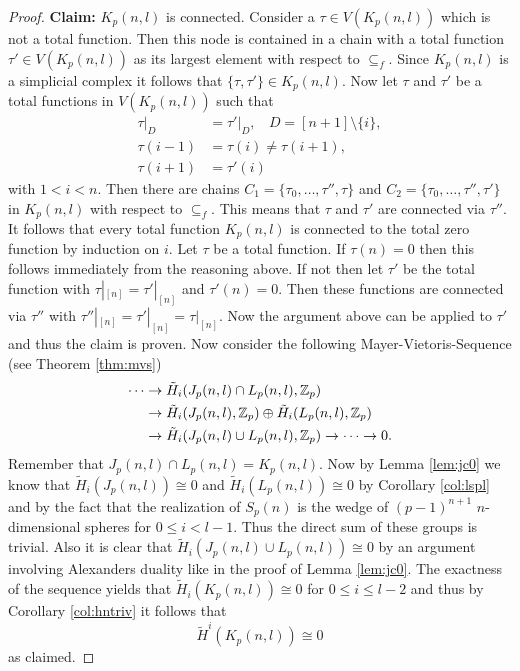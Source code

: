 \begin{proof}
  \textbf{Claim:} $K_p(n,l)$ is connected. Consider a $\tau \in V(K_p(n,l))$ which is not a total function. Then this node is contained in a chain with a total function $\tau' \in V(K_p(n,l))$ as its largest element with respect to $\subseteq_f$. Since $K_p(n,l)$ is a simplicial complex it follows that $\{\tau, \tau'\} \in K_p(n,l)$.
  Now let $\tau$ and $\tau'$ be a total functions in $V(K_p(n,l))$ such that
  \begin{align*}
    \tau|_D &= \tau'|_D, \:\:\:\: D = [n+1]\setminus \{i\}, \\
    \tau(i-1) &= \tau(i) \neq \tau(i+1), \\
    \tau(i+1) &= \tau'(i)
  \end{align*}
  with $1 < i < n$.
  Then there are chains $C_1 = \{\tau_0, \ldots, \tau'', \tau\}$ and $C_2 = \{\tau_0, \ldots, \tau'', \tau' \}$ in $K_p(n,l)$ with respect to $\subseteq_f$. This means that $\tau$ and $\tau'$ are connected via $\tau''$.
  It follows that every total function $K_p(n,l)$ is connected to the total zero function by induction on $i$. Let $\tau$ be a total function. If $\tau(n) = 0$ then this follows immediately from the reasoning above. If not then let $\tau'$ be the total function with $\tau|_{[n]} = \tau'|_{[n]}$ and $\tau'(n) = 0$. Then these functions are connected via $\tau''$ with $\tau''|_{[n]} = \tau'|_{[n]} = \tau|_{[n]}$. Now the argument above can be applied to $\tau'$ and thus the claim is proven.
  Now consider the following Mayer-Vietoris-Sequence (see Theorem \ref{thm:mvs})
  \begin{align*}
    \label{eq:mayvietk}
    \cdots &\to \tilde{H}_i(J_p(n,l)\cap L_p(n,l), \mathbb{Z}_p) \\ &\to \tilde{H}_i(J_p(n,l), \mathbb{Z}_p) \oplus \tilde{H}_i(L_p(n,l), \mathbb{Z}_p) \\ &\to \tilde{H}_i(J_p(n,l) \cup L_p(n,l), \mathbb{Z}_p) \to \cdots \to 0.
  \end{align*}
  Remember that $J_p(n,l) \cap L_p(n,l) = K_p(n,l)$. Now by Lemma \ref{lem:jc0} we know that $\tilde{H}_i(J_p(n,l)) \cong 0$ and $\tilde{H}_i(L_p(n,l)) \cong 0$ by Corollary \ref{col:lspl} and by the fact that the realization of $S_p(n)$ is the wedge of $(p-1)^{n+1}$ $n$-dimensional spheres for $0 \leq i < l-1$. Thus the direct sum of these groups is trivial. Also it is clear that $\tilde{H}_i(J_p(n,l) \cup L_p(n,l)) \cong 0$ by an argument involving Alexanders duality like in the proof of Lemma \ref{lem:jc0}. The exactness of the sequence yields that $\tilde{H}_i(K_p(n,l)) \cong 0$ for $0 \leq i \leq l-2$ and thus by Corollary \ref{col:hntriv} it follows that \[\tilde{H}^i(K_p(n,l)) \cong 0\] as claimed.
\end{proof}


